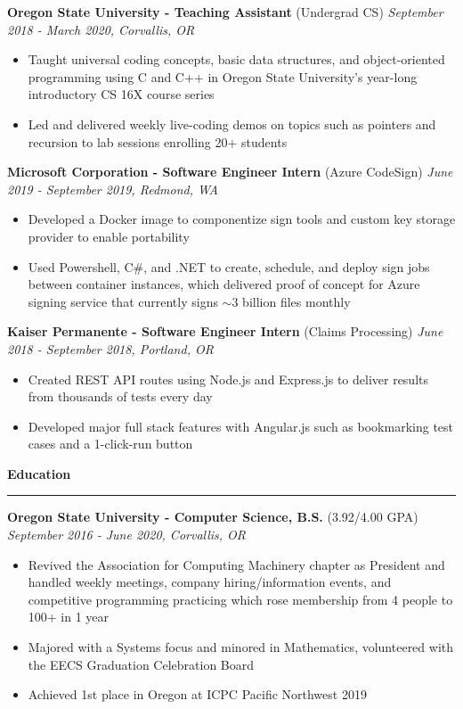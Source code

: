 \documentclass{article}
\def\hrulefill{\leavevmode\leaders\hrule height 1.2pt\hfill\kern\z}
\begin{document}
\vskip 0.1in

\noindent \normalsize \textbf{Oregon State University - Teaching Assistant} \footnotesize (Undergrad CS) \hfill \small \textit{September 2018 - March 2020, Corvallis, OR}
\begin{itemize}
    \item Taught universal coding concepts, basic data structures, and object-oriented programming using C and C++ in Oregon State University’s year-long introductory CS 16X course series
    \item Led and delivered weekly live-coding demos on topics such as pointers and recursion to lab sessions enrolling 20+ students
\end{itemize}

\vskip 0.1in

\noindent \normalsize \textbf{Microsoft Corporation - Software Engineer Intern} \footnotesize (Azure CodeSign) \hfill \small \textit{June 2019 - September 2019, Redmond, WA}
\begin{itemize}
    \item Developed a Docker image to componentize sign tools and custom key storage provider to enable portability
    \item Used Powershell, C\#, and .NET to create, schedule, and deploy sign jobs between container instances, which delivered proof of concept for Azure signing service that currently signs $\sim$3 billion files monthly
\end{itemize}

\vskip 0.1in

\noindent \normalsize \textbf{Kaiser Permanente - Software Engineer Intern} \footnotesize (Claims Processing) \hfill \small \textit{June 2018 - September 2018, Portland, OR}
\begin{itemize}
    \item Created REST API routes using Node.js and Express.js to deliver results from thousands of tests every day
    \item Developed major full stack features with Angular.js such as bookmarking test cases and a 1-click-run button
\end{itemize}

\vskip 0.1in

\noindent \large \textbf{Education } \hrulefill
\vskip 0.1in

\noindent \normalsize \textbf{Oregon State University - Computer Science, B.S.} \footnotesize (3.92/4.00 GPA) \hfill \small \textit{September 2016 - June 2020, Corvallis, OR}
\begin{itemize}
    \item Revived the Association for Computing Machinery chapter as President and handled weekly meetings, company hiring/information events, and competitive programming practicing which rose membership from 4 people to 100+ in 1 year
    \item Majored with a Systems focus and minored in Mathematics, volunteered with the EECS Graduation Celebration Board
    \item Achieved 1st place in Oregon at ICPC Pacific Northwest 2019
\end{itemize}
\end{document}
